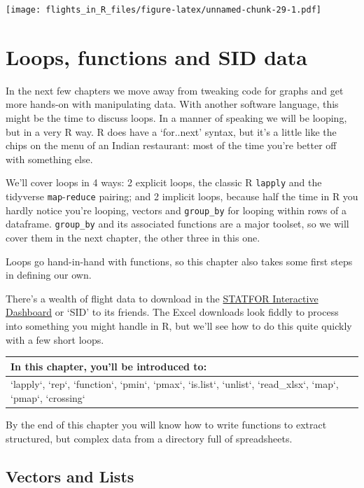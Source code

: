 \documentclass[
]{book}
\begin{document}
\texttt{[image: flights\_in\_R\_files/figure-latex/unnamed-chunk-29-1.pdf]}

\hypertarget{loopsfunctions}{%
\chapter{Loops, functions and SID data}\label{loopsfunctions}}

In the next few chapters we move away from tweaking code for graphs and get more hands-on with manipulating data. With another software language, this might be the time to discuss loops. In a manner of speaking we will be looping, but in a very R way. R does have a `for..next' syntax, but it's a little like the chips on the menu of an Indian restaurant: most of the time you're better off with something else.

We'll cover loops in 4 ways: 2 explicit loops, the classic R \texttt{lapply} and the tidyverse \texttt{map}-\texttt{reduce} pairing; and 2 implicit loops, because half the time in R you hardly notice you're looping, vectors and \texttt{group\_by} for looping within rows of a dataframe. \texttt{group\_by} and its associated functions are a major toolset, so we will cover them in the next chapter, the other three in this one.

Loops go hand-in-hand with functions, so this chapter also takes some first steps in defining our own.

There's a wealth of flight data to download in the \href{https://www.eurocontrol.int/dashboard/statfor-interactive-dashboard}{STATFOR Interactive Dashboard} or `SID' to its friends. The Excel downloads look fiddly to process into something you might handle in R, but we'll see how to do this quite quickly with a few short loops.

\begin{tabular}{l}
\hline
In this chapter, you'll be introduced to:\\
\hline
`lapply`, `rep`, `function`, `pmin`, `pmax`, `is.list`, `unlist`, `read\_xlsx`, `map`, `pmap`, `crossing`\\
\hline
\end{tabular}

By the end of this chapter you will know how to write functions to extract structured, but complex data from a directory full of spreadsheets.

\hypertarget{vectors-and-lists}{%
\section{Vectors and Lists}\label{vectors-and-lists}}
\end{document}
